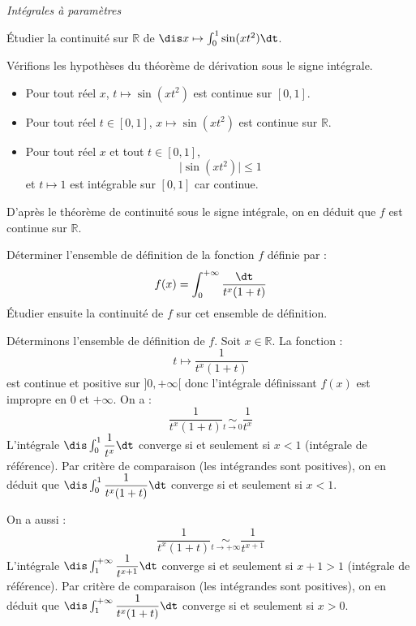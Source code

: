 \documentclass[a4paper,10pt]{report}
\begin{document}
\bigskip

\begin{center}
\textit{{ {\large Intégrales à paramètres}}}
\end{center}

\medskip

\begin{Exa} Étudier la continuité sur $\mathbb{R}$ de $\dis x \mapsto \int_{0}^1 \sin(xt^2) \dt$.
\end{Exa}

\corr Vérifions les hypothèses du théorème de dérivation sous le signe intégrale.

\begin{itemize}
\item Pour tout réel $x$, $t \mapsto \sin(xt^2)$ est continue sur $[0,1]$.
\item Pour tout réel $t \in [0,1]$,  $x \mapsto \sin(xt^2)$ est continue sur $\mathbb{R}$.
\item Pour tout réel $x$ et tout $t \in [0,1]$,
$$ \vert \sin(x t^2) \vert \leq 1$$
et $t \mapsto 1$ est intégrable sur $[0,1]$ car continue.
\end{itemize}
D'après le théorème de continuité sous le signe intégrale, on en déduit que $f$ est continue sur $\mathbb{R}$.


\begin{Exa} Déterminer l'ensemble de définition de la fonction $f$ définie par :
$$ f(x) = \int_{0}^{+ \infty} \dfrac{\dt}{t^x(1+t)}$$
Étudier ensuite la continuité de $f$ sur cet ensemble de définition.
\end{Exa}

\corr Déterminons l'ensemble de définition de $f$. Soit $x \in \mathbb{R}$. La fonction :
$$ t \mapsto  \dfrac{1}{t^x(1+t)}$$
est continue  et positive sur $]0, + \infty[$ donc l'intégrale définissant $f(x)$ est impropre en $0$ et $+ \infty$. On a :
$$  \dfrac{1}{t^x(1+t)} \underset{t \rightarrow 0}{\sim} \dfrac{1}{t^x}$$
L'intégrale $\dis \int_{0}^1 \dfrac{1}{t^x} \dt$ converge si et seulement si $x<1$ (intégrale de référence). Par critère de comparaison (les intégrandes sont positives), on en déduit que $\dis \int_{0}^1 \dfrac{1}{t^x(1+t)} \dt$ converge si et seulement si $x<1$.

\medskip

\noindent On a aussi :
$$   \dfrac{1}{t^x(1+t)} \underset{t \rightarrow + \infty}{\sim} \dfrac{1}{t^{x+1}}$$
L'intégrale $\dis \int_{1}^{+ \infty} \dfrac{1}{t^{x+1}} \dt$ converge si et seulement si $x+1>1$ (intégrale de référence). Par critère de comparaison (les intégrandes sont positives), on en déduit que $\dis \int_{1}^{+ \infty} \dfrac{1}{t^x(1+t)} \dt$ converge si et seulement si $x>0$.
\end{document}
